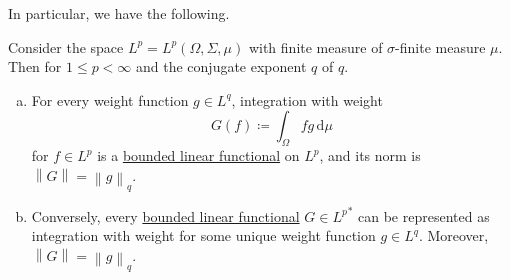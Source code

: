 In particular, we have the following.
\begin{theorem}[\({L^{p}}^{\ast} = L^q\)]\label{thm:lec6}
	Consider the space \(L^p = L^p(\Omega , \Sigma , \mu )\) with finite measure of \(\sigma \)-finite measure \(\mu \). Then for \(1 \leq p < \infty \) and the conjugate exponent \(q\) of \(q\).
	\begin{enumerate}[(a)]
		\item For every weight function \(g\in L^q\), integration with weight
		      \[
			      G(f) \coloneqq \int _\Omega fg\,\mathrm{d} \mu
		      \]
		      for \(f\in L^p\) is a \hyperref[def:bounded-linear-functional]{bounded linear functional} on \(L^p\), and its norm is \(\left\lVert G\right\rVert = \left\lVert g\right\rVert _q\).
		\item Conversely, every \hyperref[def:bounded-linear-functional]{bounded linear functional} \(G\in {L^p}^{\ast}\) can be represented as integration with weight for some unique weight function \(g\in L^q\). Moreover, \(\left\lVert G\right\rVert = \left\lVert g\right\rVert _q\).
	\end{enumerate}
\end{theorem}
